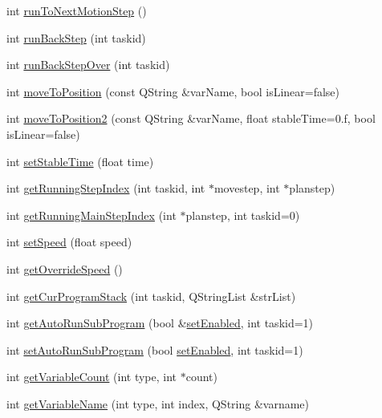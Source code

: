 \begin{DoxyCompactItemize}
\item 
int \hyperlink{classCUIApp_acf6132d19e753ba5548f9af6fbcaaa32}{run\-To\-Next\-Motion\-Step} ()
\item 
int \hyperlink{classCUIApp_a53d60c9f8804ed89187d1d06b0afb14c}{run\-Back\-Step} (int taskid)
\item 
int \hyperlink{classCUIApp_aa7570a64d24746ae8e876b78bafef329}{run\-Back\-Step\-Over} (int taskid)
\item 
int \hyperlink{classCUIApp_a44cdd21e80259e4718a443737e881cc1}{move\-To\-Position} (const Q\-String \&var\-Name, bool is\-Linear=false)
\item 
int \hyperlink{classCUIApp_ae6fb6a202f9d1a189c093eeb5e4ad4a9}{move\-To\-Position2} (const Q\-String \&var\-Name, float stable\-Time=0.f, bool is\-Linear=false)
\item 
int \hyperlink{classCUIApp_ab9ad5f3f98559557dcac912771043d34}{set\-Stable\-Time} (float time)
\item 
int \hyperlink{classCUIApp_ab37f3a8b7d7e183c81ba807b2e808cd8}{get\-Running\-Step\-Index} (int taskid, int $\ast$movestep, int $\ast$planstep)
\item 
int \hyperlink{classCUIApp_af00947fd23c355c47bfc4601ba4db337}{get\-Running\-Main\-Step\-Index} (int $\ast$planstep, int taskid=0)
\item 
int \hyperlink{classCUIApp_a5260cf4599017e2da6c99295dd6b9558}{set\-Speed} (float speed)
\item 
int \hyperlink{classCUIApp_a916a3ae9eea10c497d29b1ffc0a0af1a}{get\-Override\-Speed} ()
\item 
int \hyperlink{classCUIApp_a40a04b9026dff73dac5f426700205fdc}{get\-Cur\-Program\-Stack} (int taskid, Q\-String\-List \&str\-List)
\item 
int \hyperlink{classCUIApp_af3f0a39e3dacc4ab67611e527f91a53a}{get\-Auto\-Run\-Sub\-Program} (bool \&\hyperlink{classCUIApp_a0bb9aaecc950f991d3ecc69e5895e9e6}{set\-Enabled}, int taskid=1)
\item 
int \hyperlink{classCUIApp_a7ec5fc0b595cc0744216a3ea157db1e3}{set\-Auto\-Run\-Sub\-Program} (bool \hyperlink{classCUIApp_a0bb9aaecc950f991d3ecc69e5895e9e6}{set\-Enabled}, int taskid=1)
\item 
int \hyperlink{classCUIApp_af7fb38556ebd9cb1dab1c054170f9918}{get\-Variable\-Count} (int type, int $\ast$count)
\item 
int \hyperlink{classCUIApp_ae70f81bcbc00de588c4c50d1b556da10}{get\-Variable\-Name} (int type, int index, Q\-String \&varname)
\item 

\end{DoxyCompactItemize}
